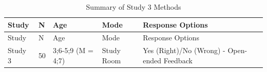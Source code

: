 \documentclass[floatsintext,man]{apa6}
\theoremstyle{definition}
\theoremstyle{definition}
\theoremstyle{definition}
\theoremstyle{remark}
\begin{document}
\begin{longtable}[]{@{}lllll@{}}
\caption{\label{tab:study3info} Summary of Study 3 Methods}\tabularnewline
\toprule
\begin{minipage}[b]{0.19\columnwidth}\raggedright\strut
Study\strut
\end{minipage} & \begin{minipage}[b]{0.02\columnwidth}\raggedright\strut
N\strut
\end{minipage} & \begin{minipage}[b]{0.20\columnwidth}\raggedright\strut
Age\strut
\end{minipage} & \begin{minipage}[b]{0.11\columnwidth}\raggedright\strut
Mode\strut
\end{minipage} & \begin{minipage}[b]{0.32\columnwidth}\raggedright\strut
Response Options\strut
\end{minipage}\tabularnewline
\midrule
\endfirsthead
\toprule
\begin{minipage}[b]{0.19\columnwidth}\raggedright\strut
Study\strut
\end{minipage} & \begin{minipage}[b]{0.02\columnwidth}\raggedright\strut
N\strut
\end{minipage} & \begin{minipage}[b]{0.20\columnwidth}\raggedright\strut
Age\strut
\end{minipage} & \begin{minipage}[b]{0.11\columnwidth}\raggedright\strut
Mode\strut
\end{minipage} & \begin{minipage}[b]{0.32\columnwidth}\raggedright\strut
Response Options\strut
\end{minipage}\tabularnewline
\midrule
\endhead
\begin{minipage}[t]{0.19\columnwidth}\raggedright\strut
Study 3\strut
\end{minipage} & \begin{minipage}[t]{0.02\columnwidth}\raggedright\strut
50\strut
\end{minipage} & \begin{minipage}[t]{0.20\columnwidth}\raggedright\strut
3;6-5;9 (M = 4;7)\strut
\end{minipage} & \begin{minipage}[t]{0.11\columnwidth}\raggedright\strut
Study Room\strut
\end{minipage} & \begin{minipage}[t]{0.32\columnwidth}\raggedright\strut
Yes (Right)/No (Wrong) - Open-ended Feedback\strut
\end{minipage}\tabularnewline
\bottomrule
\end{longtable}
\end{document}
